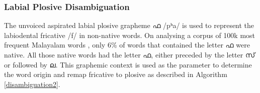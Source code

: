 \documentclass{ieeeaccess}
\begin{document}




\subsubsection{Labial Plosive Disambiguation}
\label{labiodentalfricative}

The unvoiced aspirated labial plosive grapheme {\mal ഫ} {\ipa /pʰa/} is used to represent the labiodental fricative {\ipa /f/} in non-native words. On analysing a corpus of 100k most frequent Malayalam words  \cite{kunchukuttan2020ai4bharat}, only 6\% of words that contained the letter  {\mal ഫ} were native. All those native words had the letter  {\mal ഫ}, either preceded by the letter  {\mal സ്} or followed by {\mal ല}.  This graphemic context is used as the parameter to determine the word origin and remap fricative to plosive as described in Algorithm \ref{disambiguation2}.





\end{document}
